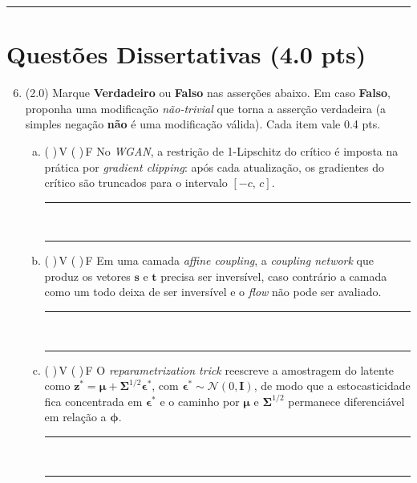\documentclass[11pt,a4paper]{article}
\begin{document}
\begin{enumerate}[1)]
\end{enumerate}

\rule{\linewidth}{0.4pt}

\section*{Questões Dissertativas (4.0 pts)}

\begin{enumerate}[1)]
\setcounter{enumi}{5}

\item (2.0) Marque \textbf{Verdadeiro} ou \textbf{Falso} nas asserções abaixo. Em caso \textbf{Falso}, proponha uma modificação \emph{não-trivial} que torna a asserção verdadeira (a simples negação \textbf{não} é uma modificação válida). Cada item vale 0.4 pts.

\begin{enumerate}[a)]
    \item ( )\,V \quad ( )\,F \quad No \textit{WGAN}, a restrição de 1-Lipschitz do crítico é imposta na prática por \textit{gradient clipping}: após cada atualização, os gradientes do crítico são truncados para o intervalo $[-c,\,c]$.\\[0.2em]
    \rule{\linewidth}{0.4pt}\\[0.2em]
    \rule{\linewidth}{0.4pt}

    \item ( )\,V \quad ( )\,F \quad Em uma camada \textit{affine coupling}, a \textit{coupling network} que produz os vetores $\mathbf{s}$ e $\mathbf{t}$ precisa ser inversível, caso contrário a camada como um todo deixa de ser inversível e o \textit{flow} não pode ser avaliado.\\[0.2em]
    \rule{\linewidth}{0.4pt}\\[0.2em]
    \rule{\linewidth}{0.4pt}

    \item ( )\,V \quad ( )\,F \quad O \textit{reparametrization trick} reescreve a amostragem do latente como $\mathbf{z}^{*} = \boldsymbol{\mu} + \boldsymbol{\Sigma}^{1/2}\boldsymbol{\epsilon}^{*}$, com $\boldsymbol{\epsilon}^{*} \sim \mathcal{N}(0,\mathbf{I})$, de modo que a estocasticidade fica concentrada em $\boldsymbol{\epsilon}^{*}$ e o caminho por $\boldsymbol{\mu}$ e $\boldsymbol{\Sigma}^{1/2}$ permanece diferenciável em relação a $\boldsymbol{\phi}$.\\[0.2em]
    \rule{\linewidth}{0.4pt}\\[0.2em]
    \rule{\linewidth}{0.4pt}


\end{enumerate}
\end{enumerate}
\end{document}

